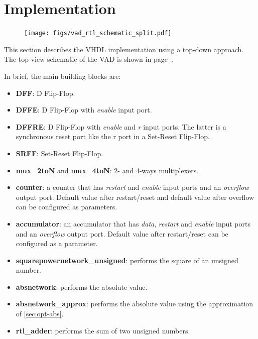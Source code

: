 \section{Implementation}

\begin{figure}
  \vspace*{-3.5cm}
  \hspace*{-3cm}
  \centering
  \texttt{[image: figs/vad\_rtl\_schematic\_split.pdf]}
  \label{fig:schematic_rtl}
\end{figure}

This section describes the VHDL implementation using a top-down approach. The 
top-view schematic of the VAD is shown in page~\pageref{fig:schematic_rtl}.

In brief, the main building blocks are:
\begin{itemize}
  \item \textbf{DFF}: D Flip-Flop.
  \item \textbf{DFFE}: D Flip-Flop with \emph{enable} input port.
  \item \textbf{DFFRE}: D Flip-Flop with \emph{enable} and \emph{r} input ports.
    The latter is a synchronous reset port like the r port in a Set-Reset Flip-Flop.
  \item \textbf{SRFF}: Set-Reset Flip-Flop.
  \item \textbf{mux\_2toN} and \textbf{mux\_4toN}: 2- and 4-ways multiplexers.
  \item \textbf{counter}: a counter that has \emph{restart} and \emph{enable}
    input ports and an \emph{overflow} output port. Default value after restart/reset
    and default value after overflow can be configured as parameters.
  \item \textbf{accumulator}: an accumulator that has \emph{data}, \emph{restart} and \emph{enable}
    input ports and an \emph{overflow} output port. Default value after restart/reset 
    can be configured as a parameter.
  \item \textbf{squarepowernetwork\_unsigned}: performs the square of an unsigned 
    number.
  \item \textbf{absnetwork}: performs the absolute value.
  \item \textbf{absnetwork\_approx}: performs the absolute value using the approximation
    of \cref{sec:opt-abs}.
  \item \textbf{rtl\_adder}: performs the sum of two unsigned numbers.
\end{itemize}

